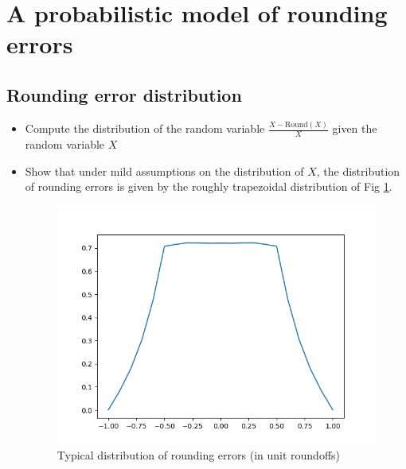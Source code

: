 \documentclass[10pt,conference]{IEEEtran}
\newcommand{\round}{\mathrm{Round}}
\begin{document}
\section{A probabilistic model of rounding errors}

\subsection{Rounding error distribution}\label{subsec:error_dist}

\begin{itemize}
\item Compute the distribution of the random variable $\frac{X-\round(X)}{X}$ given the random variable $X$
\item Show that under mild assumptions on the distribution of $X$, the distribution of rounding errors is given by the roughly trapezoidal distribution of Fig \ref{fig:trapeze}.
\begin{figure}[ht!]
\includegraphics[scale=0.55]{trapeze_dist}
\caption{Typical distribution of rounding errors (in unit roundoffs)}
\label{fig:trapeze}
\end{figure}
\end{itemize}
\end{document}
